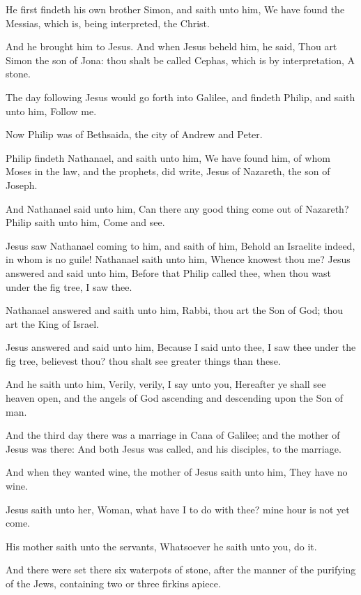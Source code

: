 \Verse He first findeth his own brother Simon, and saith unto him, We have found the Messias, which is, being interpreted, the Christ.

\Verse And he brought him to Jesus. And when Jesus beheld him, he said, Thou art Simon the son of Jona: thou shalt be called Cephas, which is by interpretation, A stone.

\Verse The day following Jesus would go forth into Galilee, and findeth Philip, and saith unto him, Follow me.

\Verse Now Philip was of Bethsaida, the city of Andrew and Peter.

\Verse Philip findeth Nathanael, and saith unto him, We have found him, of whom Moses in the law, and the prophets, did write, Jesus of Nazareth, the son of Joseph.

\Verse And Nathanael said unto him, Can there any good thing come out of Nazareth? Philip saith unto him, Come and see.

\Verse Jesus saw Nathanael coming to him, and saith of him, Behold an Israelite indeed, in whom is no guile!  \Verse Nathanael saith unto him, Whence knowest thou me? Jesus answered and said unto him, Before that Philip called thee, when thou wast under the fig tree, I saw thee.

\Verse Nathanael answered and saith unto him, Rabbi, thou art the Son of God; thou art the King of Israel.

\Verse Jesus answered and said unto him, Because I said unto thee, I saw thee under the fig tree, believest thou? thou shalt see greater things than these.

\Verse And he saith unto him, Verily, verily, I say unto you, Hereafter ye shall see heaven open, and the angels of God ascending and descending upon the Son of man.


\Chapter
\Verse And the third day there was a marriage in Cana of Galilee; and the mother of Jesus was there: \Verse And both Jesus was called, and his disciples, to the marriage.

\Verse And when they wanted wine, the mother of Jesus saith unto him, They have no wine.

\Verse Jesus saith unto her, Woman, what have I to do with thee? mine hour is not yet come.

\Verse His mother saith unto the servants, Whatsoever he saith unto you, do it.

\Verse And there were set there six waterpots of stone, after the manner of the purifying of the Jews, containing two or three firkins apiece.

